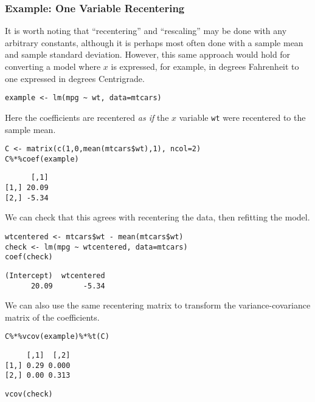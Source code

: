 \documentclass[]{article}
\begin{document}
\hypertarget{example-one-variable-recentering}{%
\subsubsection{Example: One Variable
Recentering}\label{example-one-variable-recentering}}

It is worth noting that ``recentering'' and ``rescaling'' may be done
with any arbitrary constants, although it is perhaps most often done
with a sample mean and sample standard deviation. However, this same
approach would hold for converting a model where \(x\) is expressed, for
example, in degrees Fahrenheit to one expressed in degrees Centrigrade.

\begin{verbatim}
example <- lm(mpg ~ wt, data=mtcars)
\end{verbatim}

Here the coefficients are recentered \emph{as if} the \(x\) variable
\texttt{wt} were recentered to the sample mean.

\begin{verbatim}
C <- matrix(c(1,0,mean(mtcars$wt),1), ncol=2)
C%*%coef(example)
\end{verbatim}

\begin{verbatim}
      [,1]
[1,] 20.09
[2,] -5.34
\end{verbatim}

We can check that this agrees with recentering the data, then refitting
the model.

\begin{verbatim}
wtcentered <- mtcars$wt - mean(mtcars$wt)
check <- lm(mpg ~ wtcentered, data=mtcars)
coef(check)
\end{verbatim}

\begin{verbatim}
(Intercept)  wtcentered 
      20.09       -5.34 
\end{verbatim}

We can also use the same recentering matrix to transform the
variance-covariance matrix of the coefficients.

\begin{verbatim}
C%*%vcov(example)%*%t(C)
\end{verbatim}

\begin{verbatim}
     [,1]  [,2]
[1,] 0.29 0.000
[2,] 0.00 0.313
\end{verbatim}

\begin{verbatim}
vcov(check)
\end{verbatim}
\end{document}
